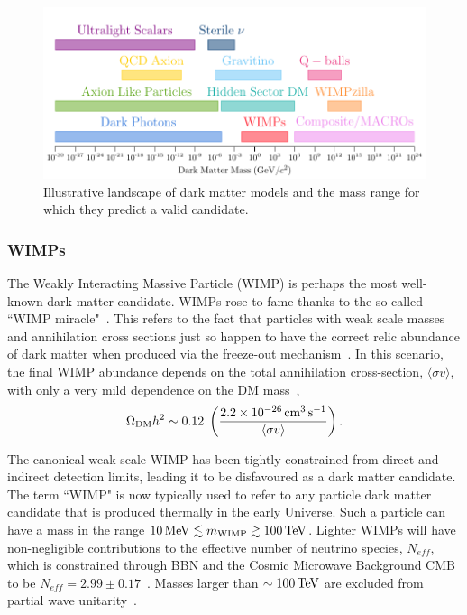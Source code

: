 \begin{figure}[t!]
    \centering
    \includegraphics{DM_model_landscape}
    \caption{Illustrative landscape of dark matter models and the mass range for which they predict a valid candidate.}
    \label{fig:DM_models_landscape}
\end{figure}

\subsubsection*{WIMPs}
The Weakly Interacting Massive Particle (WIMP) is perhaps the most well-known dark matter candidate. WIMPs rose to fame thanks to the so-called ``WIMP miracle"~\cite{Feng:2010gw_DarkMatterCandidates}. This refers to the fact that particles with weak scale masses and annihilation cross sections just so happen to have the correct relic abundance of dark matter when produced via the freeze-out mechanism~\cite{Jungman:1995df_Supersymmetricdarkmatter}. In this scenario, the final WIMP abundance depends on the total annihilation cross-section, $\langle\sigma v\rangle$, with only a very mild dependence on the DM mass~\cite{Steigman:2012nb}, 
\begin{equation}
    \Omega_{\mathrm{DM}}h^2 \sim 0.12 \; \left(\frac{2.2\times 10^{-26}{\rm \,cm}^3 {\rm \,s}^{-1}}{\langle \sigma v\rangle}\right).
\end{equation}

The canonical weak-scale WIMP has been tightly constrained from direct and indirect detection limits, leading it to be disfavoured as a dark matter candidate. The term ``WIMP"  is now typically used to refer to any particle dark matter candidate that is produced thermally in the early Universe. Such a particle can have a mass in the range $10{\rm \,MeV}\lesssim m_\mathrm{WIMP} \gtrsim 100{\rm \,TeV}$. Lighter WIMPs will have non-negligible contributions to the effective number of neutrino species, $N_{eff}$, which is constrained through BBN and the Cosmic Microwave Background CMB to be $N_{eff} = 2.99 \pm 0.17$~\cite{Planck:2018vyg_sep_Planck2018results}. Masses larger than $\sim 100{\rm \,TeV}$ are excluded from partial wave unitarity~\cite{Griest:1989wd_UnitarityLimitsMass}. 

